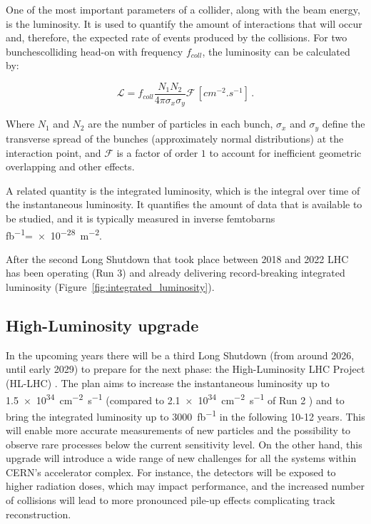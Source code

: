 One of the most important parameters of a collider, along with the beam energy, is the luminosity. It is used to quantify the amount of interactions that will occur and, therefore, the expected rate of events produced by the collisions. For two bunches\footnotemark colliding head-on with frequency \(f_{coll}\), the luminosity can be calculated by:

\begin{equation}
    \mathcal{L} = f_{coll}\frac{N_1 N_2}{4\pi \sigma_x \sigma_y} \mathcal{F} \, \left[\unit{cm^{-2}.s^{-1}}\right] \, .
\end{equation}

Where \(N_1\) and \(N_2\) are the number of particles in each bunch, \(\sigma_x\) and \(\sigma_y\) define the transverse spread of the bunches (approximately normal distributions) at the interaction point, and \(\mathcal{F}\) is a factor of order \(1\) to account for inefficient geometric overlapping and other effects.

A related quantity is the integrated luminosity, which is the integral over time of the instantaneous luminosity. It quantifies the amount of data that is available to be studied, and it is typically measured in inverse femtobarns \unit{\femto\barn^{-1}}=\qty{e-28}{\meter^{-2}}.

After the second Long Shutdown that took place between 2018 and 2022 LHC has been operating (Run 3) and already delivering record-breaking integrated luminosity (Figure~\ref{fig:integrated_luminosity}).

\subsection{High-Luminosity upgrade}\label{subsec:high_luminosity_upgrade}
In the upcoming years there will be a third Long Shutdown (from around 2026, until early 2029) to prepare for the next phase: the High-Luminosity LHC Project (HL-LHC) \cite{cernHLLHCProject}. The plan aims to increase the instantaneous luminosity up to \qty{1.5e34}{\centi\meter^{-2}\second^{-1}} (compared to \qty{2.1e34}{\centi\meter^{-2}\second^{-1}} of Run 2 \cite{CERN-LHCC-2020-007}) and to bring the integrated luminosity up to \qty{3000}{\femto\barn^{-1}} in the following 10-12 years. This will enable more accurate measurements of new particles and the possibility to observe rare processes below the current sensitivity level. On the other hand, this upgrade will introduce a wide range of new challenges for all the systems within CERN's accelerator complex. For instance, the detectors will be exposed to higher radiation doses, which may impact performance, and the increased number of collisions will lead to more pronounced pile-up effects complicating track reconstruction.

